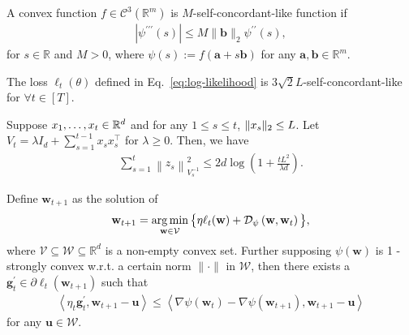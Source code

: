 \begin{myDef}
    A convex function $f \in \mathcal{C}^3\left(\mathbb{R}^m\right)$ is $M$-self-concordant-like function if
    \begin{align*}
        \left|\psi^{\prime \prime \prime}(s)\right| \leqslant M\|\mathbf{b}\|_2 \psi^{\prime \prime}(s),
    \end{align*}
    for $s \in \mathbb{R}$ and $M>0$, where $\psi(s):=f(\mathbf{a}+s \mathbf{b})$ for any $\mathbf{a}, \mathbf{b} \in \mathbb{R}^m$. 
\end{myDef}

\begin{myLemma}
    \label{lem:self-concordant}
    The loss $\ell_t(\theta)$ defined in Eq.~\eqref{eq:log-likelihood} is $3\sqrt{2} L$-self-concordant-like for $\forall t \in [T]$.
\end{myLemma}

\begin{myLemma}
    \label{lem:elliptic-potential}
    Suppose $x_1, \ldots, x_t \in \mathbb{R}^d$ and for any $1 \leq s \leq t$, $\lVert x_s\rVert_2 \leq L$. Let $V_t = \lambda I_d + \sum_{s=1}^{t-1} x_s x_s^\top $ for $\lambda \geq 0$. Then, we have 
    \begin{align*}
        \sum_{s=1}^t\left\|z_s\right\|_{V_s^{-1}}^2 \leq 2 d \log \left(1+\frac{t L^2}{\lambda d}\right).
    \end{align*}
\end{myLemma}

\begin{myLemma}
    \label{lem:implicit-omd}
    Define $\mathbf{w}_{t+1}$ as the solution of
    \begin{align*}
        \mathbf{w}_{t+1}=\operatorname*{arg\,min}_{\mathbf{w} \in \mathcal{V}} \big\{\eta \ell_t(\mathbf{w})+\mathcal{D}_\psi\left(\mathbf{w}, \mathbf{w}_t\right)\big\},
    \end{align*}
    where $\mathcal{V} \subseteq \mathcal{W} \subseteq \mathbb{R}^d$ is a non-empty convex set. Further supposing $\psi(\mathbf{w})$ is 1 -strongly convex w.r.t. a certain norm $\|\cdot\|$ in $\mathcal{W}$, then there exists a $\mathbf{g}_t^{\prime} \in \partial \ell_t\left(\mathbf{w}_{t+1}\right)$ such that
    \begin{align*}
       \left\langle\eta_t \mathbf{g}_t^{\prime}, \mathbf{w}_{t+1}-\mathbf{u}\right\rangle \leq\left\langle\nabla \psi\left(\mathbf{w}_t\right)-\nabla \psi\left(\mathbf{w}_{t+1}\right), \mathbf{w}_{t+1}-\mathbf{u}\right\rangle 
    \end{align*}
    for any $\mathbf{u} \in \mathcal{W}$.
\end{myLemma}

